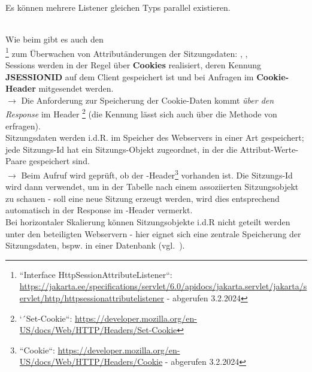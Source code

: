 \begin{tcolorbox}[enlarge top by=0.5cm,enlarge bottom by=0.5cm]
Es können mehrere Listener gleichen Typs parallel existieren.
\end{tcolorbox}\\

\noindent
Wie beim   gibt es auch den\\ \footnote{``Interface HttpSessionAttributeListener``: \url{https://jakarta.ee/specifications/servlet/6.0/apidocs/jakarta.servlet/jakarta/servlet/http/httpsessionattributelistener} - abgerufen 3.2.2024
} zum Überwachen von Attributänderungen der Sitzungsdaten: , , \\

\noindent
Sessions werden in der Regel über \textbf{Cookies} realisiert, deren Kennung\\ \textbf{JSESSIONID} auf dem Client gespeichert ist und bei Anfragen im \textbf{Cookie-Header} mitgesendet werden.\\
$\rightarrow$ Die Anforderung zur Speicherung der Cookie-Daten kommt \textit{über den Response} im Header \footnote{
    `´Set-Cookie``: \url{https://developer.mozilla.org/en-US/docs/Web/HTTP/Headers/Set-Cookie}
} (die Kennung lässt sich auch über die Methode  von  erfragen).\\

\noindent
Sitzungsdaten werden i.d.R. im Speicher des Webservers in einer Art  gespeichert; jede Sitzungs-Id hat ein Sitzungs-Objekt zugeordnet, in der die Attribut-Werte-Paare gespeichert sind.\\

$\rightarrow$ Beim Aufruf  wird geprüft, ob der -Header\footnote{
    ``Cookie``: \url{https://developer.mozilla.org/en-US/docs/Web/HTTP/Headers/Cookie} - abgerufen 3.2.2024
} vorhanden ist.
Die Sitzungs-Id wird dann verwendet, um in der Tabelle nach einem assoziierten Sitzungsobjekt zu schauen - soll eine neue Sitzung erzeugt werden, wird dies entsprechend automatisch in der Response im -Header vermerkt.\\

\noindent
Bei horizontaler Skalierung können Sitzungsobjekte i.d.R nicht geteilt werden unter den beteiligten Webservern - hier eignet sich eine zentrale Speicherung der Sitzungsdaten, bspw. in einer Datenbank (vgl.~\cite[433]{Oec22}).

